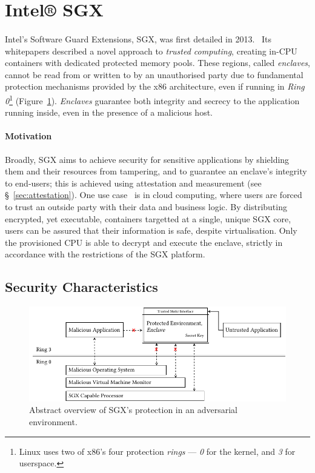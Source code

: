 
\section{Intel® SGX}

\paragraph{} Intel's Software Guard Extensions, SGX, was first detailed in 2013.~\cite{10.1145/2487726.2488370, 10.1145/2487726.2488368, Anati2013InnovativeTF, sgx-sgx-reference} Its whitepapers described a novel approach to \textit{trusted computing}, creating in-CPU containers with dedicated protected memory pools. These regions, called \textit{enclaves}, cannot be read from or written to by an unauthorised party due to fundamental protection mechanisms provided by the x86 architecture, even if running in \textit{Ring 0}\footnote{Linux uses two of x86's four protection \textit{rings} --- \textit{0} for the kernel, and \textit{3} for userspace.} (Figure~\ref{fig:sgx-basic}). \textit{Enclaves} guarantee both integrity and secrecy to the application running inside, even in the presence of a malicious host.

\paragraph{Motivation} Broadly, SGX aims to achieve security for sensitive applications by shielding them and their resources from tampering, and to guarantee an enclave's integrity to end-users; this is achieved using attestation and measurement (see §~\ref{sec:attestation}). One use case~\cite{10.1145/2834050.2834100, 10.1145/2799647, 10.1145/2810103.2813695} is in cloud computing, where users are forced to trust an outside party with their data and business logic. By distributing encrypted, yet executable, containers targetted at a single, unique SGX core, users can be assured that their information is safe, despite virtualisation. Only the provisioned CPU is able to decrypt and execute the enclave, strictly in accordance with the restrictions of the SGX platform.

\subsection{Security Characteristics}

\begin{figure}[]
    \centering
    \includegraphics[width=0.95\linewidth]{figures/SGX-architecture.pdf}
    \caption{Abstract overview of SGX's protection in an adversarial environment.}
    \label{fig:sgx-basic}
\end{figure}

